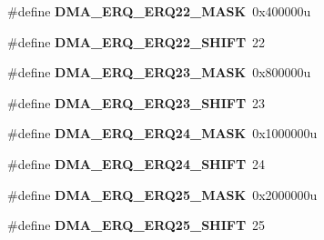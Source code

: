 \begin{DoxyCompactItemize}
\item 
\hypertarget{group___d_m_a___register___masks_ga90d3faead2123c62b96463dd7180ee87}{}\#define {\bfseries D\+M\+A\+\_\+\+E\+R\+Q\+\_\+\+E\+R\+Q22\+\_\+\+M\+A\+S\+K}~0x400000u\label{group___d_m_a___register___masks_ga90d3faead2123c62b96463dd7180ee87}

\item 
\hypertarget{group___d_m_a___register___masks_ga63584d3b20178ea7bbabaf25668585e2}{}\#define {\bfseries D\+M\+A\+\_\+\+E\+R\+Q\+\_\+\+E\+R\+Q22\+\_\+\+S\+H\+I\+F\+T}~22\label{group___d_m_a___register___masks_ga63584d3b20178ea7bbabaf25668585e2}

\item 
\hypertarget{group___d_m_a___register___masks_ga0a7a989be8c7ed0a4ebb84f760fc043b}{}\#define {\bfseries D\+M\+A\+\_\+\+E\+R\+Q\+\_\+\+E\+R\+Q23\+\_\+\+M\+A\+S\+K}~0x800000u\label{group___d_m_a___register___masks_ga0a7a989be8c7ed0a4ebb84f760fc043b}

\item 
\hypertarget{group___d_m_a___register___masks_ga652d7823588ada3f85f6fd3b5d37e788}{}\#define {\bfseries D\+M\+A\+\_\+\+E\+R\+Q\+\_\+\+E\+R\+Q23\+\_\+\+S\+H\+I\+F\+T}~23\label{group___d_m_a___register___masks_ga652d7823588ada3f85f6fd3b5d37e788}

\item 
\hypertarget{group___d_m_a___register___masks_gad6b86fd986f3cb0852e836da34830ea6}{}\#define {\bfseries D\+M\+A\+\_\+\+E\+R\+Q\+\_\+\+E\+R\+Q24\+\_\+\+M\+A\+S\+K}~0x1000000u\label{group___d_m_a___register___masks_gad6b86fd986f3cb0852e836da34830ea6}

\item 
\hypertarget{group___d_m_a___register___masks_ga7e6d8545b04856138b6fd76d7f743fcc}{}\#define {\bfseries D\+M\+A\+\_\+\+E\+R\+Q\+\_\+\+E\+R\+Q24\+\_\+\+S\+H\+I\+F\+T}~24\label{group___d_m_a___register___masks_ga7e6d8545b04856138b6fd76d7f743fcc}

\item 
\hypertarget{group___d_m_a___register___masks_gaef4a880ed9cdebb4fc2d67cf5ac7a942}{}\#define {\bfseries D\+M\+A\+\_\+\+E\+R\+Q\+\_\+\+E\+R\+Q25\+\_\+\+M\+A\+S\+K}~0x2000000u\label{group___d_m_a___register___masks_gaef4a880ed9cdebb4fc2d67cf5ac7a942}

\item 
\hypertarget{group___d_m_a___register___masks_gae2e7862434472062c952def46e8b2d10}{}\#define {\bfseries D\+M\+A\+\_\+\+E\+R\+Q\+\_\+\+E\+R\+Q25\+\_\+\+S\+H\+I\+F\+T}~25\label{group___d_m_a___register___masks_gae2e7862434472062c952def46e8b2d10}


\end{DoxyCompactItemize}
